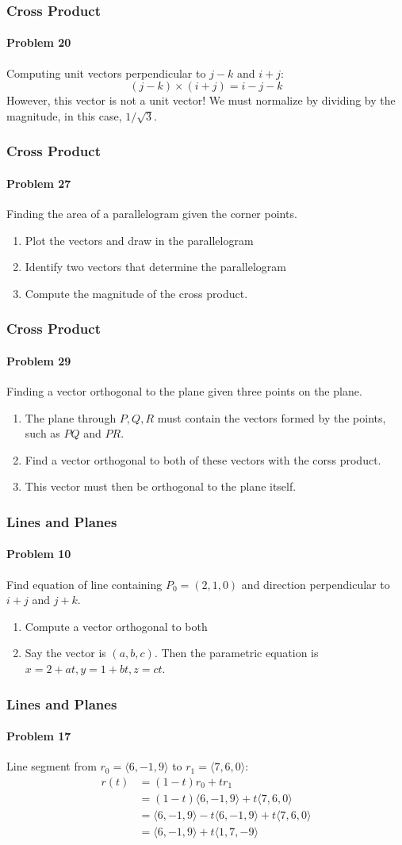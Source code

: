 \documentclass[xcolor=svgnames]{beamer}
\begin{document}
\begin{frame}
\frametitle{Cross Product}
\framesubtitle{Problem 20}
Computing unit vectors perpendicular to $j - k$ and $i + j$:
\[
	(j-k) \times (i + j) = i - j - k
\]
However, this vector is not a unit vector! We must normalize by dividing by the magnitude, in this case, $1/\sqrt{3}$. 
\end{frame}
\begin{frame}
\frametitle{Cross Product}
\framesubtitle{Problem 27}
Finding the area of a parallelogram given the corner points. 
\begin{enumerate}
\item Plot the vectors and draw in the parallelogram
\item Identify two vectors that determine the parallelogram
\item Compute the magnitude of the cross product. 
\end{enumerate}
\end{frame}
\begin{frame}
\frametitle{Cross Product}
\framesubtitle{Problem 29}
Finding a vector orthogonal to the plane given three points on the plane. 
\begin{enumerate}
\item The plane through $P,Q,R$ must contain the vectors formed by the points, such as $PQ$ and $PR$. 
\item Find a vector orthogonal to both of these vectors with the corss product.
\item This vector must then be orthogonal to the plane itself. 
\end{enumerate}
\end{frame}
\begin{frame}
\frametitle{Lines and Planes}
\framesubtitle{Problem 10}
Find equation of line containing $P_0 = (2,1,0)$ and direction perpendicular to $i+j$ and $j + k$. 
\begin{enumerate}
\item Compute a vector orthogonal to both 
\item Say the vector is $(a,b,c)$. Then the parametric equation is $x = 2 + at, y = 1 + bt, z = ct$. 
\end{enumerate}
\end{frame}
\begin{frame}
\frametitle{Lines and Planes}
\framesubtitle{Problem 17}
Line segment from $r_0 = \langle 6,-1,9 \rangle$ to $r_1 = \langle 7,6,0 \rangle $:
\begin{align*}
r(t) &= (1-t)r_0 + tr_1 \\
&= (1-t)\langle 6, -1, 9 \rangle  + t \langle 7, 6, 0 \rangle \\
&= \langle 6, -1, 9 \rangle - t\langle 6, -1, 9 \rangle + t \langle 7, 6 , 0 \rangle \\
&= \langle 6, -1, 9 \rangle + t \langle 1, 7, -9 \rangle
\end{align*}
\end{frame}
\end{document}
